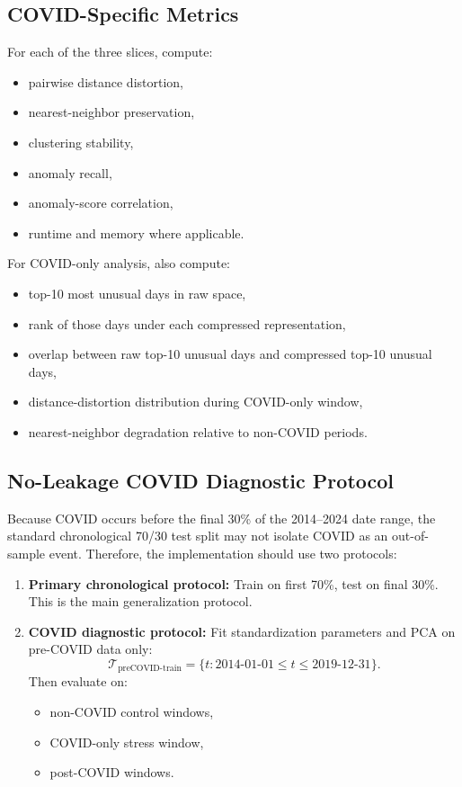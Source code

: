 \documentclass[11pt]{article}
\begin{document}
\subsection{COVID-Specific Metrics}

For each of the three slices, compute:

\begin{itemize}
    \item pairwise distance distortion,
    \item nearest-neighbor preservation,
    \item clustering stability,
    \item anomaly recall,
    \item anomaly-score correlation,
    \item runtime and memory where applicable.
\end{itemize}

For COVID-only analysis, also compute:

\begin{itemize}
    \item top-10 most unusual days in raw space,
    \item rank of those days under each compressed representation,
    \item overlap between raw top-10 unusual days and compressed top-10 unusual days,
    \item distance-distortion distribution during COVID-only window,
    \item nearest-neighbor degradation relative to non-COVID periods.
\end{itemize}

\subsection{No-Leakage COVID Diagnostic Protocol}

Because COVID occurs before the final 30\% of the 2014--2024 date range, the standard chronological 70/30 test split may not isolate COVID as an out-of-sample event. Therefore, the implementation should use two protocols:

\begin{enumerate}
    \item \textbf{Primary chronological protocol:} Train on first 70\%, test on final 30\%. This is the main generalization protocol.

    \item \textbf{COVID diagnostic protocol:} Fit standardization parameters and PCA on pre-COVID data only:
    \[
    \mathcal{T}_{\text{preCOVID-train}} =
    \{t: 2014\text{-}01\text{-}01 \leq t \leq 2019\text{-}12\text{-}31\}.
    \]
    Then evaluate on:
    \begin{itemize}
        \item non-COVID control windows,
        \item COVID-only stress window,
        \item post-COVID windows.
    \end{itemize}
\end{enumerate}
\end{document}
